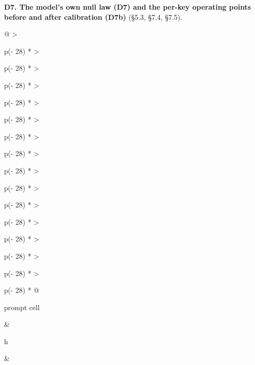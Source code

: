 \documentclass[11pt,letterpaper]{article}
\begin{document}
\textbf{D7. The model's own null law (D7) and the per-key operating points before and after calibration (D7b)} (\S{}5.3, \S{}7.4, \S{}7.5).

\begin{landscape}{\scriptsize\setlength{\tabcolsep}{2.5pt}\begin{longtable}[]{@{}
  >{\raggedright\arraybackslash}p{(\columnwidth - 28\tabcolsep) * }
  >{\raggedright\arraybackslash}p{(\columnwidth - 28\tabcolsep) * }
  >{\raggedright\arraybackslash}p{(\columnwidth - 28\tabcolsep) * }
  >{\raggedright\arraybackslash}p{(\columnwidth - 28\tabcolsep) * }
  >{\raggedright\arraybackslash}p{(\columnwidth - 28\tabcolsep) * }
  >{\raggedright\arraybackslash}p{(\columnwidth - 28\tabcolsep) * }
  >{\raggedright\arraybackslash}p{(\columnwidth - 28\tabcolsep) * }
  >{\raggedright\arraybackslash}p{(\columnwidth - 28\tabcolsep) * }
  >{\raggedright\arraybackslash}p{(\columnwidth - 28\tabcolsep) * }
  >{\raggedright\arraybackslash}p{(\columnwidth - 28\tabcolsep) * }
  >{\raggedright\arraybackslash}p{(\columnwidth - 28\tabcolsep) * }
  >{\raggedright\arraybackslash}p{(\columnwidth - 28\tabcolsep) * }
  >{\raggedright\arraybackslash}p{(\columnwidth - 28\tabcolsep) * }
  >{\raggedright\arraybackslash}p{(\columnwidth - 28\tabcolsep) * }
  >{\raggedright\arraybackslash}p{(\columnwidth - 28\tabcolsep) * }@{}}
\caption*{\textbf{Table D7.} The model's own null law: the nominal and the diagonal conformal@5000 levels of the 1,000 evaluation keys on the 5,000 unwatermarked generations per cell, with the predictor's values; the aggregate comparison of the two negative classes is LUNA's and the two-key practice the artefact's (\S{}7.4). Extracted verbatim from the Study 4 report's generated Table 14 (block \texttt{model\_\allowbreak{}null} of \texttt{outputs/\allowbreak{}study4\_\allowbreak{}v0.\allowbreak{}1/\allowbreak{}report/\allowbreak{}tables.\allowbreak{}md}, written by the report builder from the locked record and agreed at checkpoint R10); the report's own column note follows the table.}\tabularnewline
\toprule\noalign{}
\begin{minipage}[b]{\linewidth}\raggedright
prompt cell
\end{minipage} & \begin{minipage}[b]{\linewidth}\raggedright
h
\end{minipage} & \begin{minipage}[b]{\linewidth}\raggedright

\end{minipage}
\end{longtable}}
\end{landscape}
\end{document}
